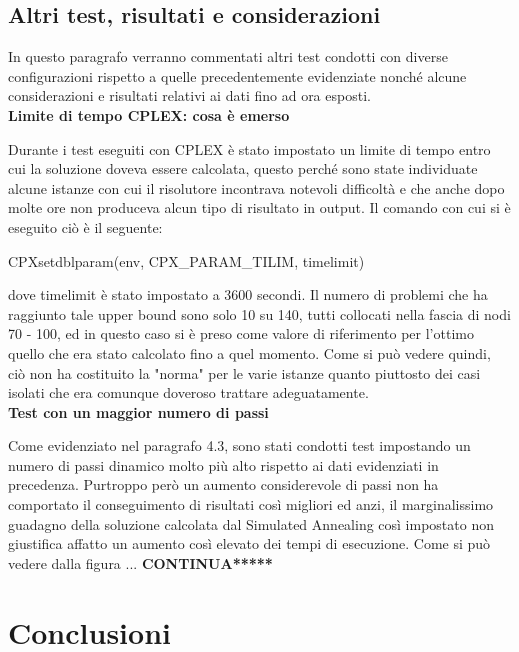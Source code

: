 \documentclass[preprint,12pt]{elsarticle}
\begin{document}
\subsection{\textbf{Altri test, risultati e considerazioni}}

In questo paragrafo verranno commentati altri test condotti con diverse configurazioni rispetto a quelle precedentemente evidenziate nonché alcune considerazioni e risultati relativi ai dati fino ad ora esposti. \\

{\large \textbf{Limite di tempo CPLEX: cosa è emerso}}

Durante i test eseguiti con CPLEX è stato impostato un limite di tempo entro cui la soluzione doveva essere calcolata, questo perché sono state individuate alcune istanze con cui il risolutore incontrava notevoli difficoltà e che anche dopo molte ore non produceva alcun tipo di risultato in output. Il comando con cui si è eseguito ciò è il seguente:

\begin{center}
CPXsetdblparam(env, CPX\_PARAM\_TILIM, timelimit)
\end{center}
dove timelimit è stato impostato a 3600 secondi. Il numero di problemi che ha raggiunto tale upper bound sono solo 10 su 140, tutti collocati nella fascia di nodi 70 - 100, ed in questo caso si è preso come valore di riferimento per l'ottimo quello che era stato calcolato fino a quel momento. Come si può vedere quindi, ciò non ha costituito la "norma" per le varie istanze quanto piuttosto dei casi isolati che era comunque doveroso trattare adeguatamente.\\

{\large \textbf{Test con un maggior numero di passi}}

Come evidenziato nel paragrafo 4.3, sono stati condotti test impostando un numero di passi dinamico molto più alto rispetto ai dati evidenziati in precedenza. Purtroppo però un aumento considerevole di passi non ha comportato il conseguimento di risultati così migliori ed anzi, il marginalissimo guadagno della soluzione calcolata dal Simulated Annealing così impostato non giustifica affatto un aumento così elevato dei tempi di esecuzione. Come si può vedere dalla figura ... \textbf{CONTINUA*****}

\section{Conclusioni}
\label{S:5}
\end{document}
